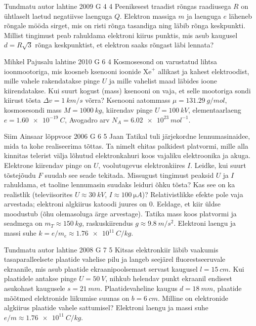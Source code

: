 \documentclass[11pt]{article}
\begin{document}
{%
{Tundmatu autor} %
{lahtine} %
{2009} %
{G 4} %
{4} %
{
\ifStatement
Peenikesest traadist rõngas raadiusega $R$ on ühtlaselt laetud negatiivse laenguga $Q$. Elektron massiga $m$ ja laenguga $e$ läheneb rõngale mööda sirget, mis on risti rõnga tasandiga ning läbib rõnga keskpunkti. Millist tingimust peab rahuldama elektroni kiirus punktis, mis asub kaugusel $d = R\sqrt 3$ rõnga keskpunktist, et elektron saaks rõngast läbi lennata?
\fi
}

{Mihkel Pajusalu} %
{lahtine} %
{2010} %
{G 6} %
{4} %
{
\ifStatement
Kosmosesond on varustatud lihtsa ioonmootoriga, mis koosneb ksenooni
ioonide $\mathrm{Xe}^+$ allikast ja kahest elektroodist, mille vahele rakendatakse pinge
$U$ ja mille vahelist maad läbides ioone kiirendatakse. Kui suurt kogust
(mass) ksenooni on vaja, et selle mootoriga sondi kiirust tõsta
$\Delta v=\SI{1}{km/s}$ võrra?
%
Ksenooni aatommass $\mu=\SI{131,29}{g/mol}$, kosmosesondi mass $M=\SI{1000}{kg}$, kiirendav pinge
$U=\SI{100}{kV}$, elementaarlaeng $e=\SI{1,60 e-19}{C}$, Avogadro arv
$N_A= \SI{6,02 e23}{mol^{-1}}$.
\fi
}

{Siim Ainsaar} %
{lõppvoor} %
{2006} %
{G 6} %
{5} %
{
\ifStatement
Jaan Tatikal tuli järjekordne lennumasinaidee, mida ta kohe realiseerima tõttas. Ta nimelt ehitas palkidest platvormi, mille alla kinnitas telerist välja lõhutud elektronkahuri koos vajaliku elektroonika ja akuga. Elektrone kiirendav pinge on $U$, voolutugevus elektronkiires $I$. Leidke, kui suurt tõstejõudu $F$ suudab see seade tekitada. Missugust tingimust peaksid $U$ ja $I$ rahuldama, et taoline lennumasin suudaks leiduri õhku tõsta? Kas see on ka realistlik (televiisorites $U \approx \SI{30}{kV}$, $I \approx \SI{100}{\micro A}$)? Relativistlikke efekte pole vaja arvestada; elektroni algkiirus katoodi juures on 0. Eeldage, et kiir üldse moodustub (õhu olemasoluga ärge arvestage). Tatika mass koos platvormi ja seadmega on $m_T \approx \SI{150}{kg}$, raskuskiirendus $g \approx \SI{9,8}{m/s^2}$. Elektroni laengu ja massi suhe $k = e/m_e \approx \SI{1,76e11}{C/kg}$.
\fi
}

{Tundmatu autor} %
{lahtine} %
{2008} %
{G 7} %
{5} %
{
\ifStatement
Kitsas elektronkiir läbib vaakumis tasaparalleelsete plaatide vahelise pilu ja langeb seejärel fluorestseeruvale ekraanile, mis asub plaatide ekraanipoolsemast servast kaugusel $l = \SI{15}{cm}$. Kui plaatidele antakse pinge $U = \SI{50}{V}$, nihkub helendav punkt ekraanil endisest asukohast kaugusele $s = \SI{21}{mm}$. Plaatidevaheline kaugus $d = \SI{18}{mm}$, plaatide mõõtmed elektronide liikumise suunas on $b = \SI{6}{cm}$. Milline on elektronide algkiirus plaatide vahele sattumisel? Elektroni laengu ja massi suhe $e/m \approx \SI{1,76e11}{C/kg}$.
\fi
}

}
\end{document}
